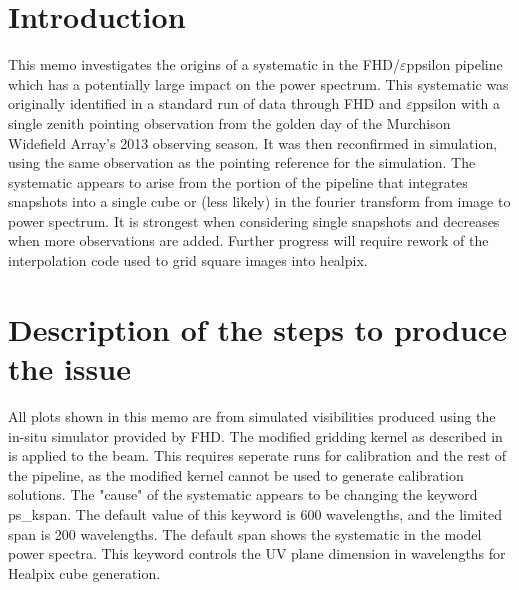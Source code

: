 \documentclass[linenumbers]{aastex631}
\newcommand\eppsilon{$\varepsilon$ppsilon\xspace}
\begin{document}

\author{Lindsay Berkhout}





\section{Introduction}
This memo investigates the origins of a systematic in the FHD/\eppsilon{} pipeline which has a potentially large impact on the power spectrum. This systematic was originally identified in a standard run of data through FHD and \eppsilon{} with a single zenith pointing observation from the golden day of the Murchison Widefield Array's 2013 observing season. It was then reconfirmed in simulation, using the same observation as the pointing reference for the simulation. The systematic appears to arise from the portion of the pipeline that integrates snapshots into a single cube or (less likely) in the fourier transform from image to power spectrum. It is strongest when considering single snapshots and decreases when more observations are added. Further progress will require rework of the interpolation code used to grid square images into healpix. \newline 

\section{Description of the steps to produce the issue}
All plots shown in this memo are from simulated visibilities produced using the in-situ simulator provided by FHD. The modified gridding kernel as described in \cite{Barry} is applied to the beam. This requires seperate runs for calibration and the rest of the pipeline, as the modified kernel cannot be used to generate calibration solutions. \newline
The "cause" of the systematic appears to be changing the keyword ps\_kspan. The default value of this keyword is 600 wavelengths, and the limited span is 200 wavelengths. The default span shows the systematic in the model power spectra. This keyword controls the UV plane dimension in wavelengths for Healpix cube generation.  \newline
\end{document}
